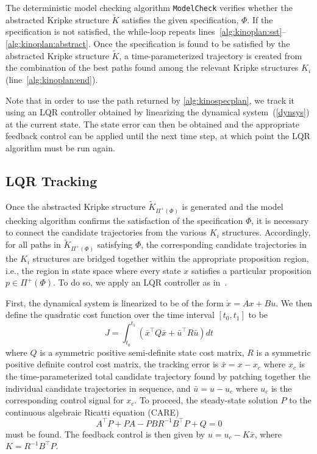 The deterministic \mucalc{} model checking algorithm \texttt{ModelCheck} verifies whether the abstracted Kripke structure $\tilde{K}$ satisfies the given specification, $\Phi$. If the specification is not satisfied, the while-loop repeats lines~\ref{alg:kinoplan:sst}--\ref{alg:kinoplan:abstract}. Once the specification is found to be satisfied by the abstracted Kripke structure $\tilde{K}$, a time-parameterized trajectory is created from the combination of the best paths found among the relevant Kripke structures $K_i$ (line~\ref{alg:kinoplan:end}).

Note that in order to use the path returned by \autoref{alg:kinospecplan}, we track it using an LQR controller obtained by linearizing the dynamical system~(\ref{dynsys}) at the current state. The state error can then be obtained and the appropriate feedback control can be applied until the next time step, at which point the LQR algorithm must be run again. 

\subsection{LQR Tracking}\label{section:lqr}

Once the abstracted Kripke structure $\tilde{K}_{\Pi^+(\Phi)}$ is generated and the model checking algorithm confirms the satisfaction of the \mucalc{} specification $\Phi$, it is necessary to connect the candidate trajectories from the various $K_i$ structures. Accordingly, for all paths in $\tilde{K}_{\Pi^+(\Phi)}$ satisfying $\Phi$, the corresponding candidate trajectories in the $K_i$ structures are bridged together within the appropriate proposition region, i.e., the region in state space where every state $x$ satisfies a particular proposition $p \in \Pi^+(\Phi)$. To do so, we apply an LQR controller as in~\cite{Tedrake2009}.

First, the dynamical system is linearized to be of the form $\dot x = Ax + Bu$. We then define the quadratic cost function over the time interval $[ t_0, t_1 ]$ to be
\begin{equation}
    J = \int_{t_0}^{t_1} \left( {\bar x}^\top Q {\bar x} + {\bar u}^\top R {\bar u} \right)dt
\end{equation}
where $Q$ is a symmetric positive semi-definite state cost matrix, $R$ is a symmetric positive definite control cost matrix, the tracking error is $\bar x = x - x_c$ where $x_c$ is the time-parameterized total candidate trajectory found by patching together the individual candidate trajectories in sequence, and $\bar u = u - u_c$ where $u_c$ is the corresponding control signal for $x_c$. To proceed, the steady-state solution $P$ to the continuous algebraic Ricatti equation (CARE)
\begin{equation}
    A^\top P + PA - PBR^{-1}B^\top P + Q = 0 
\end{equation}
must be found. The feedback control is then given by $u = u_c - K{\bar x}$, where $K = R^{-1}B^\top P$.

